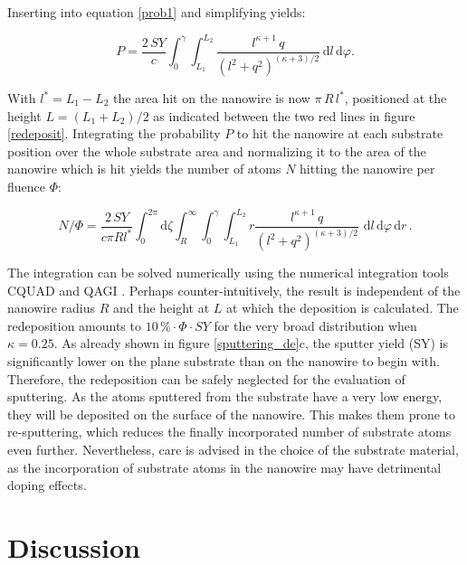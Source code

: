 Inserting into equation \ref{prob1} and simplifying yields:

\begin{equation}
\label{prob2}
P = \frac{2\,SY}{c} \int_0^{\gamma} \! \int_{L_1}^{L_2} \!  \frac{l^{\kappa+1}\,q}{(l^2 + q^2)^{(\kappa + 3)/2}} \,\mathrm{d}l \, \mathrm{d}\varphi.
\end{equation}

With $l^*=L_1-L_2$ the area hit on the nanowire is now $\pi \, R \, l^*$, positioned at the height $L= (L_1+L_2)/2$ as indicated between the two red lines in figure \ref{redeposit}. Integrating the probability $P$ to hit the nanowire at each substrate position over the whole substrate area and normalizing it to the area of the nanowire which is hit yields the number of atoms $N$ hitting the nanowire per fluence $\Phi$:

\begin{equation}
\label{prob2}
N/\Phi = \frac{2\,SY}{c \pi Rl^*} \int_0^{2\pi}\! \mathrm{d}\zeta \int_R^{\infty} \!
\int_0^{\gamma} \! \int_{L_1}^{L_2} \! r \frac{l^{\kappa+1}\,q}{(l^2 + q^2)^{(\kappa + 3)/2}}\,\,\mathrm{d}l \, \mathrm{d}\varphi\,\mathrm{d}r \, .
\end{equation}

The integration can be solved numerically using the numerical integration tools CQUAD and QAGI \cite{gough_gnu_2009}. Perhaps counter-intuitively, the result is independent of the nanowire radius $R$ and the height at $L$ at which the deposition is calculated. The redeposition amounts to $10\,\% \cdot \Phi\cdot SY$ for the very broad distribution when $\kappa = 0.25$. As already shown in figure \ref{sputtering_de}c, the sputter yield (SY) is significantly lower on the plane substrate than on the nanowire to begin with. Therefore, the redeposition can be safely neglected for the evaluation of sputtering. As the atoms sputtered from the substrate have a very low energy, they will be deposited on the surface of the nanowire. This makes them prone to re-sputtering, which reduces the finally incorporated number of substrate atoms even further. Nevertheless, care is advised in the choice of the substrate material, as the incorporation of substrate atoms in the nanowire may have detrimental doping effects.




\section{Discussion}